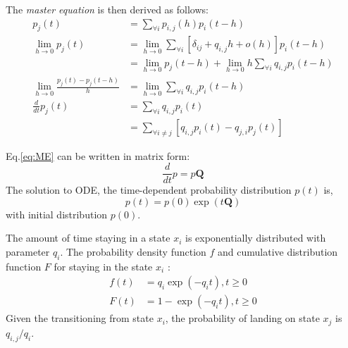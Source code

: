 The \textit{master equation} is then derived as follows:
\begin{align}
	p_{j}(t) & =\sum_{\forall i} p_{i, j}(h) p_{i}(t-h) \nonumber \\
	\lim_{h\rightarrow 0} p_{j}(t) 
		& = \lim_{h\rightarrow 0} \sum_{\forall i} \left[ \delta_{ij}+q_{i,j} h+o(h)\right]  p_{i}(t-h) \nonumber \\ 
		& = \lim_{h\rightarrow 0} p_{j}(t-h) + \lim_{h\rightarrow 0} h \sum_{\forall i} q_{i,j} p_{i}(t-h) \nonumber \\
	\lim_{h\rightarrow 0} \frac{p_{j}(t) - p_{j}(t-h)}{h} 
		&= \lim_{h\rightarrow 0} \sum_{\forall i} q_{i,j} p_{i}(t-h) \nonumber\\
	\frac{d}{dt} p_{j}(t) & = \sum_{\forall i} q_{i,j} p_{i}(t) \nonumber\\ 
		& = \sum_{\forall i \neq j}\left[  q_{i,j} p_{i}(t) - q_{j,i} p_{j}(t) \right]
	\label{eq:ME}
\end{align}


Eq.\ref{eq:ME} can be written in matrix form:
\begin{equation}
\frac{d}{dt} p = p\textbf{Q}
\end{equation}
The solution to ODE, the time-dependent probability distribution $ p(t) $ is, 
\begin{equation}
p(t)=p(0) \exp (t\textbf{Q})
\end{equation}
with initial distribution $ p(0) $.

The amount of time staying in a state $ x_{i} $ is exponentially distributed with parameter $ q_{i} $. The probability density function $ f $ and cumulative distribution function $ F $ for staying in the state $ x_{i} $ \cite{Nodelman1995}:
\begin{align}
f(t) & = q_{i} \exp \left(-q_{i} t\right), t\geq 0  \label{eq:f(t)_homo}\\
F(t) & = 1 - \exp \left(-q_{i} t\right), t\geq 0 
\end{align}
Given the transitioning from state $ x_{i} $, the probability of landing on state $ x_{j} $ is $ q_{i,j}/q_{i} $.
